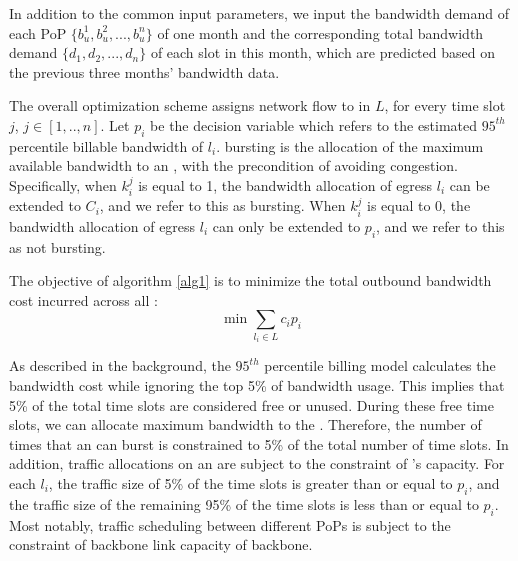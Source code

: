 In addition to the common input parameters, we input the bandwidth demand of each PoP $\{b^1_u, b^2_u, ..., b^n_u\}$ of one month and the corresponding total bandwidth demand $\{d_1, d_2,..., d_{n}\}$ of each slot in this month, which are predicted based on the previous three months' bandwidth data. 

 

The overall optimization scheme assigns network flow to {\egress} in $L$, for every time slot $j$, $j\in[1,..,n]$. Let $p_i$ be the decision variable which refers to the estimated $95^{th}$ percentile billable bandwidth of {\egress} $l_i$. {\Egress} bursting is the allocation of the maximum available bandwidth to an {\egress}, with the precondition of avoiding congestion. Specifically, when $k_{i}^j$ is equal to 1, the bandwidth allocation of egress $l_i$ can be extended to $C_i$, and we refer to this as bursting. When $k_{i}^j$ is equal to 0, the bandwidth allocation of egress $l_i$ can only be extended to $p_i$, and we refer to this as not bursting.



The objective of algorithm \ref{alg1} is to minimize the total outbound bandwidth cost incurred across all {\egresses}:
$$\min\sum_{l_i \in L} c_i p_i$$


As described in the background, the $95^{th}$ percentile billing model calculates the bandwidth cost while ignoring the top 5\% of bandwidth usage. This implies that 5\% of the total time slots are considered free or unused. During these free time slots, we can allocate maximum bandwidth to the {\egress}. Therefore, the number of times that an {\egress} can burst is constrained to 5\% of the total number of time slots. In addition, traffic allocations on an {\egress} are subject to the constraint of {\egress}'s capacity. For each {\egress} $l_i$, the traffic size of 5\% of the time slots is greater than or equal to $p_i$, and the traffic size of the remaining 95\% of the time slots is less than or equal to $p_i$. Most notably, traffic scheduling between different PoPs is subject to the constraint of backbone link capacity of backbone.


